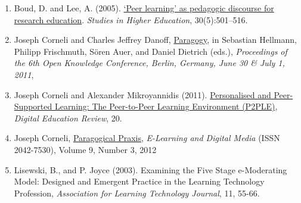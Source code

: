 \begin{enumerate}
\item
  Boud, D. and Lee, A. (2005).
  \href{http://manainkblog.typepad.com/faultlines/files/BoudLee2005.pdf}{`Peer
  learning' as pedagogic discourse for research education}.
  \emph{Studies in Higher Education}, 30(5):501--516.
\item
  Joseph Corneli and Charles Jeffrey Danoff,
  \href{http://ceur-ws.org/Vol-739/paper\_5.pdf}{Paragogy}, in Sebastian
  Hellmann, Philipp Frischmuth, Sören Auer, and Daniel Dietrich (eds.),
  \emph{Proceedings of the 6th Open Knowledge Conference, Berlin,
  Germany, June 30 \& July 1, 2011},
\item
  Joseph Corneli and Alexander Mikroyannidis (2011).
  \href{http://greav.ub.edu/der/index.php/der/article/view/188/330}{Personalised
  and Peer-Supported Learning: The Peer-to-Peer Learning Environment
  (P2PLE)}, \emph{Digital Education Review}, 20.
\item
  Joseph Corneli,
  \href{http://paragogy.net/ParagogicalPraxisPaper}{Paragogical Praxis},
  \emph{E-Learning and Digital Media} (ISSN 2042-7530), Volume 9, Number
  3, 2012
\item
  Lisewski, B., and P. Joyce (2003). Examining the Five Stage
  e-Moderating Model: Designed and Emergent Practice in the Learning
  Technology Profession, \emph{Association for Learning Technology
  Journal}, 11, 55-66.
\end{enumerate}
